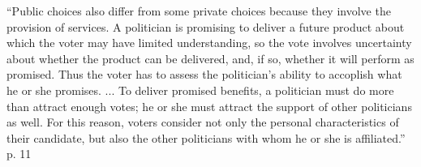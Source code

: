 ``Public choices also differ from some private choices because they involve the provision of services. A politician is promising to deliver a future product about which the voter may have limited understanding, so the vote involves uncertainty about whether the product can be delivered, and, if so, whether it will perform as promised. Thus the voter has to assess the politician's ability to accoplish what he or she promises. ... To deliver promised benefits, a politician must do more than attract enough votes; he or she must attract the support of other politicians as well. For this reason, voters consider not only the personal characteristics of their candidate, but also the other politicians with whom he or she is affiliated.'' p. 11




